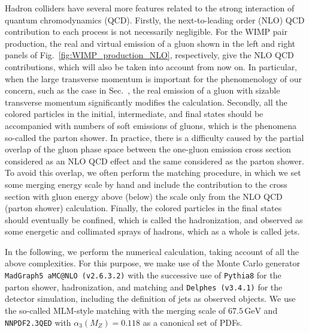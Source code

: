 \documentclass[12pt,twoside,book]{article}
\begin{document}
Hadron colliders have several more features related to the strong interaction of quantum chromodynamics (QCD).
Firstly, the next-to-leading order (NLO) QCD contribution to each process is not necessarily negligible.
For the WIMP pair production, the real and virtual emission of a gluon shown in the left and right panels of Fig.~\ref{fig:WIMP_production_NLO}, respectively, give the NLO QCD contributions, which will also be taken into account from now on.
In particular, when the large transverse momentum is important for the phenomenology of our concern, such as the case in Sec.~, the real emission of a gluon with sizable transverse momentum significantly modifies the calculation.
Secondly, all the colored particles in the initial, intermediate, and final states should be accompanied with numbers of soft emissions of gluons, which is the phenomena so-called the parton shower.
In practice, there is a difficulty caused by the partial overlap of the gluon phase space between the one-gluon emission cross section considered as an NLO QCD effect and the same considered as the parton shower.
To avoid this overlap, we often perform the matching procedure, in which we set some merging energy scale by hand and include the contribution to the cross section with gluon energy above (below) the scale only from the NLO QCD (parton shower) calculation.
Finally, the colored particles in the final states should eventually be confined, which is called the hadronization, and observed as some energetic and collimated sprays of hadrons, which as a whole is called jets.

In the following, we perform the numerical calculation, taking account of all the above complexities.
For this purpose, we make use of the Monte Carlo generator \texttt{MadGraph5 aMC@NLO (v2.6.3.2)} \cite{Alwall:2011uj,Alwall:2014hca} with the successive use of \texttt{Pythia8} \cite{Sjostrand:2014zea} for the parton shower, hadronization, and matching and \texttt{Delphes (v3.4.1)} \cite{deFavereau:2013fsa} for the detector simulation, including the definition of jets as observed objects.
We use the so-called MLM-style matching \cite{Mangano:2006rw} with the merging scale of $67.5\,\mathrm{GeV}$ and \texttt{NNPDF2.3QED} with $\alpha_3 (M_Z) = 0.118$ \cite{Ball:2013hta} as a canonical set of PDFs.
\end{document}
